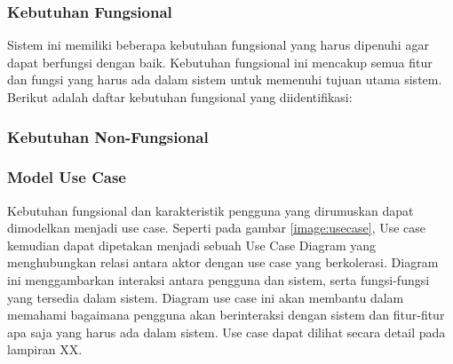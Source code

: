 \subsubsection{Kebutuhan Fungsional}

Sistem ini memiliki beberapa kebutuhan fungsional yang harus dipenuhi agar dapat berfungsi dengan baik. Kebutuhan fungsional ini mencakup semua fitur dan fungsi yang harus ada dalam sistem untuk memenuhi tujuan utama sistem. Berikut adalah daftar kebutuhan fungsional yang diidentifikasi:


\subsubsection{Kebutuhan Non-Fungsional}

\subsubsection{Model Use Case}

Kebutuhan fungsional dan karakteristik pengguna yang dirumuskan dapat dimodelkan menjadi use case. Seperti pada gambar \ref{image:usecase}, Use case kemudian dapat dipetakan menjadi sebuah Use Case Diagram yang menghubungkan relasi antara aktor dengan use case yang berkolerasi. Diagram ini menggambarkan interaksi antara pengguna dan sistem, serta fungsi-fungsi yang tersedia dalam sistem. Diagram use case ini akan membantu dalam memahami bagaimana pengguna akan berinteraksi dengan sistem dan fitur-fitur apa saja yang harus ada dalam sistem. Use case dapat dilihat secara detail pada lampiran XX.

